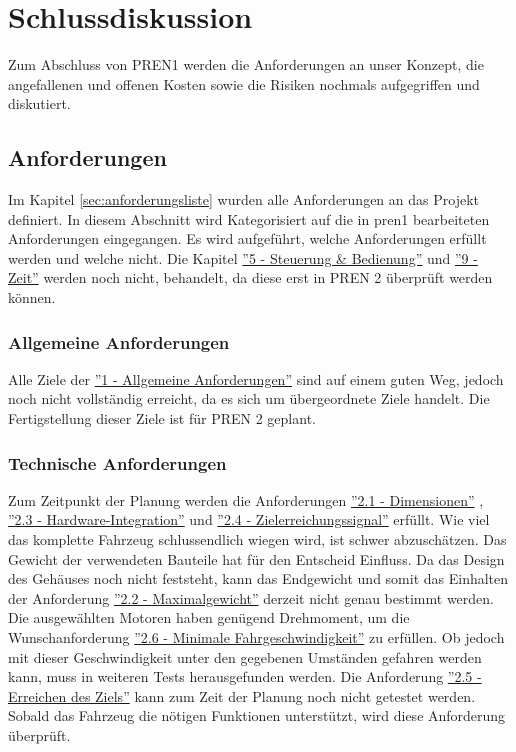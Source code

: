 \documentclass[../main.tex]{subfiles}
\begin{document}
\newpage
\section{Schlussdiskussion}

Zum Abschluss von PREN1 werden die Anforderungen an unser Konzept, die angefallenen und offenen Kosten sowie die Risiken nochmals aufgegriffen und diskutiert.

\subsection{Anforderungen}

Im Kapitel \ref{sec:anforderungsliste} wurden alle Anforderungen an das Projekt definiert.
In diesem Abschnitt wird Kategorisiert auf die in \acrshort{pren1}
bearbeiteten Anforderungen eingegangen. Es wird aufgeführt, welche Anforderungen erfüllt werden und welche nicht.
Die Kapitel \hyperlink{A5}{''5 - Steuerung \& Bedienung''} und \hyperlink{A9}{''9 - Zeit''} werden noch nicht, behandelt, da diese erst in PREN 2 überprüft werden können.

\subsubsection{Allgemeine Anforderungen}
Alle Ziele der \hyperlink{A1}{''1 - Allgemeine Anforderungen''} sind auf einem guten Weg, jedoch noch nicht vollständig erreicht, da es sich um übergeordnete Ziele handelt. Die Fertigstellung dieser Ziele ist für PREN 2 geplant.

\subsubsection{Technische Anforderungen}
Zum Zeitpunkt der Planung werden die Anforderungen \hyperlink{A2.1}{''2.1 - Dimensionen''} , \hyperlink{A2.3}{''2.3 - Hardware-Integration''} und \hyperlink{A2.4}{''2.4 - Zielerreichungssignal''} erfüllt. Wie viel das komplette Fahrzeug schlussendlich wiegen wird, ist schwer abzuschätzen. Das Gewicht der verwendeten Bauteile hat für den Entscheid Einfluss. Da das Design des Gehäuses noch nicht feststeht, kann das Endgewicht und somit das Einhalten der Anforderung \hyperlink{A2.2}{''2.2 - Maximalgewicht''} derzeit nicht genau bestimmt werden. Die ausgewählten Motoren haben genügend Drehmoment, um die Wunschanforderung \hyperlink{A2.6}{''2.6 - Minimale Fahrgeschwindigkeit''} zu erfüllen. Ob jedoch mit dieser Geschwindigkeit unter den gegebenen Umständen gefahren werden kann, muss in weiteren Tests herausgefunden werden.
Die Anforderung \hyperlink{A2.5}{''2.5 - Erreichen des Ziels''} kann zum Zeit der Planung noch nicht getestet werden. Sobald das Fahrzeug die nötigen Funktionen unterstützt, wird diese Anforderung überprüft.
\end{document}
